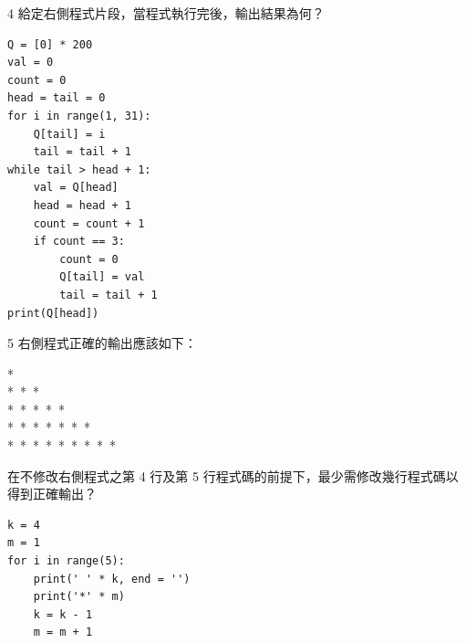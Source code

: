\medskip

\begin{qbox}{4}
給定右側程式片段，當程式執行完後，輸出結果為何？

\begin{verbatim}
Q = [0] * 200
val = 0
count = 0
head = tail = 0
for i in range(1, 31):
    Q[tail] = i
    tail = tail + 1
while tail > head + 1:
    val = Q[head]
    head = head + 1
    count = count + 1
    if count == 3:
        count = 0
        Q[tail] = val
        tail = tail + 1
print(Q[head])
\end{verbatim}

\end{qbox}

\medskip

\begin{qbox}{5}
右側程式正確的輸出應該如下：

\begin{center}\ttfamily\small
\phantom{****}*\\
\phantom{**}*\ *\ *\\
*\ *\ *\ *\ *\\
*\ *\ *\ *\ *\ *\ *\\
*\ *\ *\ *\ *\ *\ *\ *\ *
\end{center}

在不修改右側程式之第 4 行及第 5 行程式碼的前提下，最少需修改幾行程式碼以得到正確輸出？

\begin{verbatim}
k = 4
m = 1
for i in range(5):
    print(' ' * k, end = '')
    print('*' * m)
    k = k - 1
    m = m + 1
\end{verbatim}

\end{qbox}

\medskip

